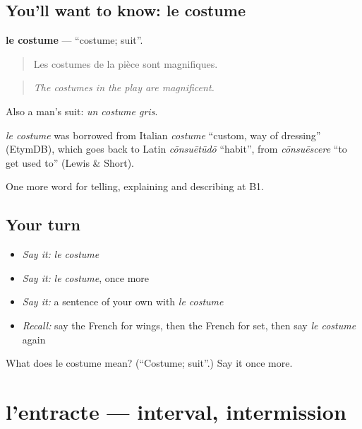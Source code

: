 \subsection*{You'll want to know: le costume}
\textbf{le costume} — \textquotedblleft{}costume; suit\textquotedblright{}.

\begin{quote}
Les costumes de la pièce sont magnifiques.
\end{quote}

\begin{quote}
\emph{The costumes in the play are magnificent.}
\end{quote}

Also a man's suit: \emph{un costume gris}.

\begin{cousinweb}
\emph{le costume} was borrowed from Italian \emph{costume} \textquotedblleft{}custom, way of dressing\textquotedblright{} (EtymDB), which goes back to Latin \emph{cōnsuētūdō} \textquotedblleft{}habit\textquotedblright{}, from \emph{cōnsuēscere} \textquotedblleft{}to get used to\textquotedblright{} (Lewis \& Short).
\end{cousinweb}

\begin{grammarlens}[title={What you've built}]
One more word for telling, explaining and describing at B1.
\end{grammarlens}

\subsection*{Your turn}
\begin{itemize}
\raggedright
  \item \emph{Say it:} \emph{le costume}
  \item \emph{Say it:} \emph{le costume}, once more
  \item \emph{Say it:} a sentence of your own with \emph{le costume}
  \item \emph{Recall:} say the French for wings, then the French for set, then say \emph{le costume} again
\end{itemize}

\begin{tcolorbox}[breakable,colback=teal!4,colframe=teal!35!black,title={Before you move on}]
What does le costume mean? (\textquotedblleft{}Costume; suit\textquotedblright{}.) Say it once more.
\end{tcolorbox}
\section[l'entracte]{l'entracte — interval, intermission}

